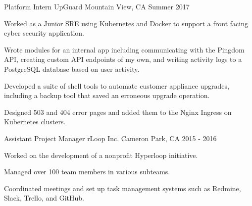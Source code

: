 

\begin{cventries}

\cventry 
{Platform Intern}
{UpGuard}
{Mountain View, CA}
{Summer 2017}
{
\begin{cvitems}
\item {Worked as a Junior SRE using Kubernetes and Docker to support a front facing cyber security application.}
\item {Wrote modules for an internal app including communicating with the Pingdom API, creating custom API endpoints of my own, and writing activity logs to a PostgreSQL database based on user activity.}
\item {Developed a suite of shell tools to automate customer appliance upgrades, including a backup tool that saved an erroneous upgrade operation.}
\item {Designed 503 and 404 error pages and added them to the Nginx Ingress on Kubernetes clusters.}
\end{cvitems}
}
\cventry
   {Assistant Project Manager}
   {rLoop Inc.}
   {Cameron Park, CA}
   {2015 - 2016}
   {
     \begin{cvitems}
       \item{Worked on the development of a nonprofit Hyperloop initiative.}
       \item {Managed over 100 team members in various subteams.}
       \item {Coordinated meetings and set up task management systems such as Redmine, Slack, Trello, and GitHub.}

\end{cvitems}}
\end{cventries}
